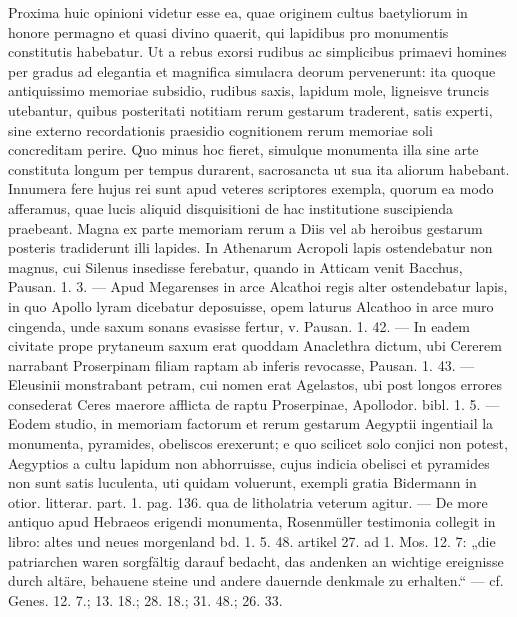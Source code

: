 \documentclass[a4paper, 11pt, oneside, polutonikogreek, german]{article}
\begin{document}
Proxima huic opinioni videtur esse ea, quae originem cultus baetyliorum in honore permagno et quasi divino quaerit, qui lapidibus pro monumentis constitutis habebatur. Ut a rebus exorsi rudibus ac simplicibus primaevi homines per gradus ad elegantia et magnifica simulacra deorum pervenerunt: ita quoque antiquissimo memoriae subsidio, rudibus saxis, lapidum mole, ligneisve truncis utebantur, quibus posteritati notitiam rerum gestarum traderent, satis experti, sine externo recordationis praesidio cognitionem rerum memoriae soli concreditam perire. Quo minus hoc fieret, simulque monumenta illa sine arte constituta longum per tempus durarent, sacrosancta ut sua ita aliorum habebant. Innumera fere hujus rei sunt apud veteres scriptores exempla, quorum ea modo afferamus, quae lucis aliquid disquisitioni de hac institutione suscipienda praebeant. Magna ex parte memoriam rerum a Diis vel ab heroibus gestarum posteris tradiderunt illi lapides. In Athenarum Acropoli lapis ostendebatur non magnus, cui Silenus insedisse ferebatur, quando in Atticam venit Bacchus, Pausan. 1. 3. --- Apud Megarenses in arce Alcathoi regis alter ostendebatur lapis, in quo Apollo lyram dicebatur deposuisse, opem laturus Alcathoo in arce muro cingenda, unde saxum sonans evasisse fertur, v. Pausan. 1. 42. --- In eadem civitate prope prytaneum saxum erat quoddam Anaclethra dictum, ubi Cererem narrabant Proserpinam filiam raptam ab inferis revocasse, Pausan. 1. 43. --- Eleusinii monstrabant petram, cui nomen erat Agelastos, ubi post longos errores consederat Ceres maerore afflicta de raptu Proserpinae, Apollodor. bibl. 1. 5. --- Eodem studio, in memoriam factorum et rerum gestarum Aegyptii ingentiail la monumenta, pyramides, obeliscos erexerunt; e quo scilicet solo conjici non potest, Aegyptios a cultu lapidum non abhorruisse, cujus indicia obelisci et pyramides non sunt satis luculenta, uti quidam voluerunt, exempli gratia Bidermann in otior. litterar. part. 1. pag. 136. qua de litholatria veterum agitur. --- De more antiquo apud Hebraeos erigendi monumenta, Rosenmüller testimonia collegit in libro: altes und neues morgenland bd. 1. 5. 48. artikel 27. ad 1. Mos. 12. 7: „die patriarchen waren sorgfältig darauf bedacht, das andenken an wichtige ereignisse durch altäre, behauene steine und andere dauernde denkmale zu erhalten.“ --- cf. Genes. 12. 7.; 13. 18.; 28. 18.; 31. 48.; 26. 33.
\end{document}
